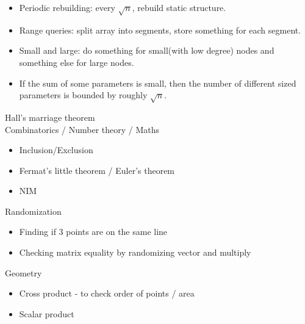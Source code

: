 \documentclass[8pt,a4paper,landscape,oneside]{amsart}
\begin{document}
\begin{multicols*}{2}
\begin{large}
\begin{itemize}
  \item Periodic rebuilding: every $\sqrt{n}$, rebuild static structure.
  \item Range queries: split array into segments, store something for each segment.
  \item Small and large: do something for small(with low degree) nodes and something else for large nodes.
  \item If the sum of some parameters is small, then the number of different sized parameters is bounded by roughly $\sqrt{n}$.
\end{itemize}
Hall's marriage theorem\\
Combinatorics / Number theory / Maths
\begin{itemize}
  \item Inclusion/Exclusion
  \item Fermat's little theorem / Euler's theorem
  \item NIM
\end{itemize}
Randomization
\begin{itemize}
  \item Finding if 3 points are on the same line
  \item Checking matrix equality by randomizing vector and multiply
\end{itemize}
Geometry
\begin{itemize}
  \item Cross product - to check order of points / area
  \item Scalar product
\end{itemize}

\end{large}
\end{multicols*}
\end{document}
